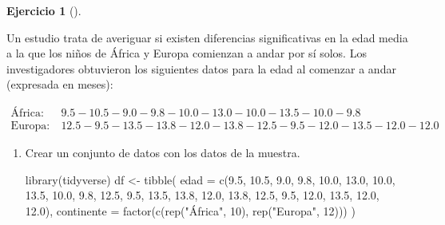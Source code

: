 \documentclass[
  a4paper,
]{scrreport}
\newenvironment{Shaded}{\begin{snugshade}}{\end{snugshade}}
\newcommand{\AttributeTok}[1]{\textcolor[rgb]{0.40,0.45,0.13}{#1}}
\newcommand{\DecValTok}[1]{\textcolor[rgb]{0.68,0.00,0.00}{#1}}
\newcommand{\FloatTok}[1]{\textcolor[rgb]{0.68,0.00,0.00}{#1}}
\newcommand{\FunctionTok}[1]{\textcolor[rgb]{0.28,0.35,0.67}{#1}}
\newcommand{\NormalTok}[1]{\textcolor[rgb]{0.00,0.23,0.31}{#1}}
\newcommand{\OtherTok}[1]{\textcolor[rgb]{0.00,0.23,0.31}{#1}}
\newcommand{\StringTok}[1]{\textcolor[rgb]{0.13,0.47,0.30}{#1}}
\theoremstyle{definition}
\newtheorem{exercise}{Ejercicio}[chapter]
\theoremstyle{remark}
\begin{document}
\begin{exercise}[]\protect\hypertarget{exr-contraste-hipotesis-media-edad-andar}{}\label{exr-contraste-hipotesis-media-edad-andar}

Un estudio trata de averiguar si existen diferencias significativas en
la edad media a la que los niños de África y Europa comienzan a andar
por sí solos. Los investigadores obtuvieron los siguientes datos para la
edad al comenzar a andar (expresada en meses):

\begin{align*}
\textrm{África}:& \ 9.5-10.5-9.0-9.8-10.0-13.0-10.0-13.5-10.0-9.8\\
\textrm{Europa}:& \ 12.5-9.5-13.5-13.8-12.0-13.8-12.5-9.5-12.0-13.5-12.0-12.0
\end{align*}

\begin{enumerate}
\def\labelenumi{\alph{enumi}.}
\item
  Crear un conjunto de datos con los datos de la muestra.

  \begin{tcolorbox}[enhanced jigsaw, breakable, toptitle=1mm, colbacktitle=quarto-callout-tip-color!10!white, rightrule=.15mm, opacityback=0, opacitybacktitle=0.6, titlerule=0mm, coltitle=black, colframe=quarto-callout-tip-color-frame, colback=white, bottomtitle=1mm, leftrule=.75mm, toprule=.15mm, title=\textcolor{quarto-callout-tip-color}{\faLightbulb}\hspace{0.5em}{Solución}, arc=.35mm, bottomrule=.15mm, left=2mm]

\begin{Shaded}
\begin{Highlighting}[]
\FunctionTok{library}\NormalTok{(tidyverse)}
\NormalTok{df }\OtherTok{\textless{}{-}} \FunctionTok{tibble}\NormalTok{(}
    \AttributeTok{edad =} \FunctionTok{c}\NormalTok{(}\FloatTok{9.5}\NormalTok{, }\FloatTok{10.5}\NormalTok{, }\FloatTok{9.0}\NormalTok{, }\FloatTok{9.8}\NormalTok{, }\FloatTok{10.0}\NormalTok{, }\FloatTok{13.0}\NormalTok{, }\FloatTok{10.0}\NormalTok{, }\FloatTok{13.5}\NormalTok{, }\FloatTok{10.0}\NormalTok{, }\FloatTok{9.8}\NormalTok{, }\FloatTok{12.5}\NormalTok{, }\FloatTok{9.5}\NormalTok{, }\FloatTok{13.5}\NormalTok{, }\FloatTok{13.8}\NormalTok{, }\FloatTok{12.0}\NormalTok{, }\FloatTok{13.8}\NormalTok{, }\FloatTok{12.5}\NormalTok{, }\FloatTok{9.5}\NormalTok{, }\FloatTok{12.0}\NormalTok{, }\FloatTok{13.5}\NormalTok{, }\FloatTok{12.0}\NormalTok{, }\FloatTok{12.0}\NormalTok{),}
    \AttributeTok{continente =} \FunctionTok{factor}\NormalTok{(}\FunctionTok{c}\NormalTok{(}\FunctionTok{rep}\NormalTok{(}\StringTok{"África"}\NormalTok{, }\DecValTok{10}\NormalTok{), }\FunctionTok{rep}\NormalTok{(}\StringTok{"Europa"}\NormalTok{, }\DecValTok{12}\NormalTok{)))}
\NormalTok{)}
\end{Highlighting}
\end{Shaded}


\end{tcolorbox}
\end{enumerate}
\end{exercise}
\end{document}
